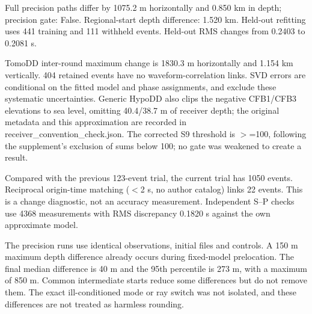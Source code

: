 \par{}\par{}

\par{}\par{}\par{}

Full precision paths differ by 1075.2 m horizontally and 0.850 km in depth; precision gate: False. Regional-start depth difference: 1.520 km. Held-out refitting uses 441 training and 111 withheld events. Held-out RMS changes from 0.2403 to 0.2081 s.

TomoDD inter-round maximum change is 1830.3 m horizontally and 1.154 km vertically. 404 retained events have no waveform-correlation links. SVD errors are conditional on the fitted model and phase assignments, and exclude these systematic uncertainties. Generic HypoDD also clips the negative CFB1/CFB3 elevations to sea level, omitting 40.4/38.7 m of receiver depth; the original metadata and this approximation are recorded in receiver\_convention\_check.json. The corrected S9 threshold is $>$=100, following the supplement's exclusion of sums below 100; no gate was weakened to create a result.

Compared with the previous 123-event trial, the current trial has 1050 events. Reciprocal origin-time matching ($<$2 s, no author catalog) links 22 events. This is a change diagnostic, not an accuracy measurement. Independent S--P checks use 4368 measurements with RMS discrepancy 0.1820 s against the own approximate model.

The precision runs use identical observations, initial files and controls. A 150 m maximum depth difference already occurs during fixed-model prelocation. The final median difference is 40 m and the 95th percentile is 273 m, with a maximum of 850 m. Common intermediate starts reduce some differences but do not remove them. The exact ill-conditioned mode or ray switch was not isolated, and these differences are not treated as harmless rounding.

\par{}

\par{}\par{}\par{}

